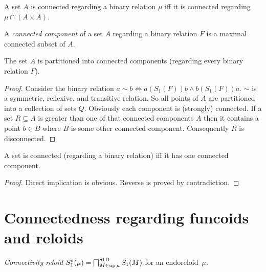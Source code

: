\begin{cor}
A set $A$ is connected regarding a binary relation $\mu$ iff it
is connected regarding $\mu\cap(A\times A)$.\end{cor}
\begin{defn}
A \emph{connected component} of a set
$A$ regarding a binary relation $F$ is a maximal connected subset
of $A$.\end{defn}
\begin{thm}
The set $A$ is partitioned into connected components (regarding every
binary relation $F$).\end{thm}
\begin{proof}
Consider the binary relation $a\sim b\Leftrightarrow a\mathrel{(S_1(F))}b\wedge b\mathrel{(S_1(F))}a$.
$\sim$ is a symmetric, reflexive, and transitive relation. So all
points of $A$ are partitioned into a collection of sets $Q$. Obviously
each component is (strongly) connected. If a set $R\subseteq A$ is
greater than one of that connected components $A$ then it contains
a point $b\in B$ where $B$ is some other connected component. Consequently
$R$ is disconnected.\end{proof}
\begin{prop}
A set is connected (regarding a binary relation) iff it has one connected
component.\end{prop}
\begin{proof}
Direct implication is obvious. Reverse is proved by contradiction.
\end{proof}

\section{Connectedness regarding funcoids and reloids}
\begin{defn}
\emph{Connectivity reloid} $S_{1}^{\ast}(\mu)=\bigsqcap_{M\in\operatorname{up}\mu}^{\mathsf{RLD}}S_{1}(M)$
for an endoreloid~$\mu$.
\end{defn}

